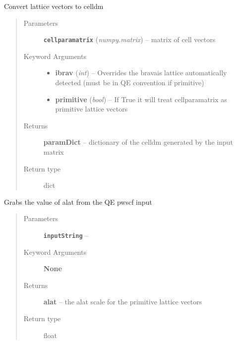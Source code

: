 \documentclass[letterpaper,10pt,english]{sphinxmanual}
\begin{document}
\begin{fulllineitems}
\label{retr:retr.__free2celldm}
Convert lattice vectors to celldm
\begin{quote}\begin{description}
\item[{Parameters}] \leavevmode
\textbf{\texttt{cellparamatrix}} (\emph{numpy.matrix}) -- matrix of cell vectors

\item[{Keyword Arguments}] \leavevmode\begin{itemize}
\item {} 
\textbf{ibrav} (\emph{int}) --
Overrides the bravais lattice automatically detected
(must be in QE convention if primitive)

\item {} 
\textbf{primitive} (\emph{bool}) --
If True it will treat cellparamatrix as primitive lattice vectors

\end{itemize}

\item[{Returns}] \leavevmode
\textbf{paramDict} --
dictionary of the celldm generated by the input matrix

\item[{Return type}] \leavevmode
dict

\end{description}\end{quote}

\end{fulllineitems}


\begin{fulllineitems}
\label{retr:retr.__getAlatFromInput}
Grabs the value of alat from the QE pwscf input
\begin{quote}\begin{description}
\item[{Parameters}] \leavevmode
\textbf{\texttt{inputString}} -- 

\item[{Keyword Arguments}] \leavevmode
\textbf{None}

\item[{Returns}] \leavevmode
\textbf{alat} --
the alat scale for the primitive lattice vectors

\item[{Return type}] \leavevmode
float

\end{description}\end{quote}

\end{fulllineitems}
\end{document}
